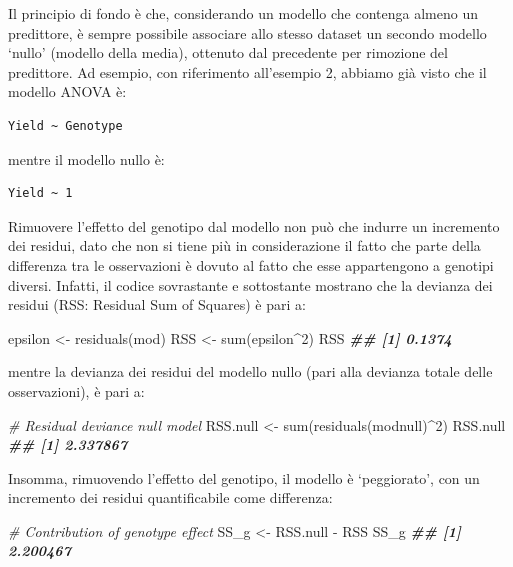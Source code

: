 \documentclass[
  12pt,
]{book}
\newenvironment{Shaded}{\begin{snugshade}}{\end{snugshade}}
\newcommand{\CommentTok}[1]{\textcolor[rgb]{0.56,0.35,0.01}{\textit{#1}}}
\newcommand{\DecValTok}[1]{\textcolor[rgb]{0.00,0.00,0.81}{#1}}
\newcommand{\DocumentationTok}[1]{\textcolor[rgb]{0.56,0.35,0.01}{\textbf{\textit{#1}}}}
\newcommand{\FunctionTok}[1]{\textcolor[rgb]{0.00,0.00,0.00}{#1}}
\newcommand{\NormalTok}[1]{#1}
\newcommand{\OtherTok}[1]{\textcolor[rgb]{0.56,0.35,0.01}{#1}}
\newcommand{\SpecialCharTok}[1]{\textcolor[rgb]{0.00,0.00,0.00}{#1}}
\begin{document}
Il principio di fondo è che, considerando un modello che contenga almeno un predittore, è sempre possibile associare allo stesso dataset un secondo modello `nullo' (modello della media), ottenuto dal precedente per rimozione del predittore. Ad esempio, con riferimento all'esempio 2, abbiamo già visto che il modello ANOVA è:

\begin{verbatim}
Yield ~ Genotype
\end{verbatim}

mentre il modello nullo è:

\begin{verbatim}
Yield ~ 1
\end{verbatim}

Rimuovere l'effetto del genotipo dal modello non può che indurre un incremento dei residui, dato che non si tiene più in considerazione il fatto che parte della differenza tra le osservazioni è dovuto al fatto che esse appartengono a genotipi diversi. Infatti, il codice sovrastante e sottostante mostrano che la devianza dei residui (RSS: Residual Sum of Squares) è pari a:

\begin{Shaded}
\begin{Highlighting}[]
\NormalTok{epsilon }\OtherTok{\textless{}{-}} \FunctionTok{residuals}\NormalTok{(mod)}
\NormalTok{RSS }\OtherTok{\textless{}{-}} \FunctionTok{sum}\NormalTok{(epsilon}\SpecialCharTok{\^{}}\DecValTok{2}\NormalTok{)}
\NormalTok{RSS}
\DocumentationTok{\#\# [1] 0.1374}
\end{Highlighting}
\end{Shaded}

mentre la devianza dei residui del modello nullo (pari alla devianza totale delle osservazioni), è pari a:

\begin{Shaded}
\begin{Highlighting}[]
\CommentTok{\# Residual deviance null model}
\NormalTok{RSS.null }\OtherTok{\textless{}{-}} \FunctionTok{sum}\NormalTok{(}\FunctionTok{residuals}\NormalTok{(modnull)}\SpecialCharTok{\^{}}\DecValTok{2}\NormalTok{)}
\NormalTok{RSS.null}
\DocumentationTok{\#\# [1] 2.337867}
\end{Highlighting}
\end{Shaded}

Insomma, rimuovendo l'effetto del genotipo, il modello è `peggiorato', con un incremento dei residui quantificabile come differenza:

\begin{Shaded}
\begin{Highlighting}[]
\CommentTok{\# Contribution of genotype effect}
\NormalTok{SS\_g }\OtherTok{\textless{}{-}}\NormalTok{ RSS.null }\SpecialCharTok{{-}}\NormalTok{ RSS}
\NormalTok{SS\_g}
\DocumentationTok{\#\# [1] 2.200467}
\end{Highlighting}
\end{Shaded}
\end{document}
